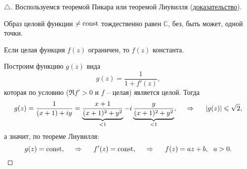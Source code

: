 \begin{proof}[$\triangle$]

Воспользуемся теоремой Пикара или теоремой Лиувилля (\href{https://ru.wikipedia.org/wiki/%D0%A2%D0%B5%D0%BE%D1%80%D0%B5%D0%BC%D0%B0_%D0%9B%D0%B8%D1%83%D0%B2%D0%B8%D0%BB%D0%BB%D1%8F_%D0%BE%D0%B1_%D0%BE%D0%B3%D1%80%D0%B0%D0%BD%D0%B8%D1%87%D0%B5%D0%BD%D0%BD%D1%8B%D1%85_%D1%86%D0%B5%D0%BB%D1%8B%D1%85_%D0%B0%D0%BD%D0%B0%D0%BB%D0%B8%D1%82%D0%B8%D1%87%D0%B5%D1%81%D0%BA%D0%B8%D1%85_%D1%84%D1%83%D0%BD%D0%BA%D1%86%D0%B8%D1%8F%D1%85}{доказательство}). 

\begin{to_thr}
    Образ целовй функции $\neq \const$ тождественно равен $\mathbb{C}$, без, быть может, одной точки. 
\end{to_thr}

\begin{to_thr}
    Если целая функция $f(z)$ ограничен, то $f(z)$ константа. 
\end{to_thr}

Построим функцию $g(z)$ вида
\begin{equation*}
    g(z) = \frac{1}{1 + f'(z)},
\end{equation*}
которая по условию ($\Re f' > 0$ и $f$ -- целая) является целой. Тогда
\begin{equation*}
    g(z) = \frac{1}{(x+1) + i y} = \underbrace{\frac{x + 1}{(x+1)^2 + y^2}}_{< 1} - i \underbrace{\frac{y}{(x+1)^2 + y^2}}_{< 1},
    \hspace{0.5cm} \Rightarrow \hspace{0.5cm}
    |g(z)| \leq \sqrt{2},
\end{equation*}
а значит, по теореме Лиувилля:
\begin{equation*}
    g(z) = \const,
    \hspace{0.5cm} \Rightarrow \hspace{0.5cm}
    f'(z) = \const,
    \hspace{0.5cm} \Rightarrow \hspace{0.5cm}
    f(z) = a z + b, \ \ a > 0.
\end{equation*}




\end{proof}

